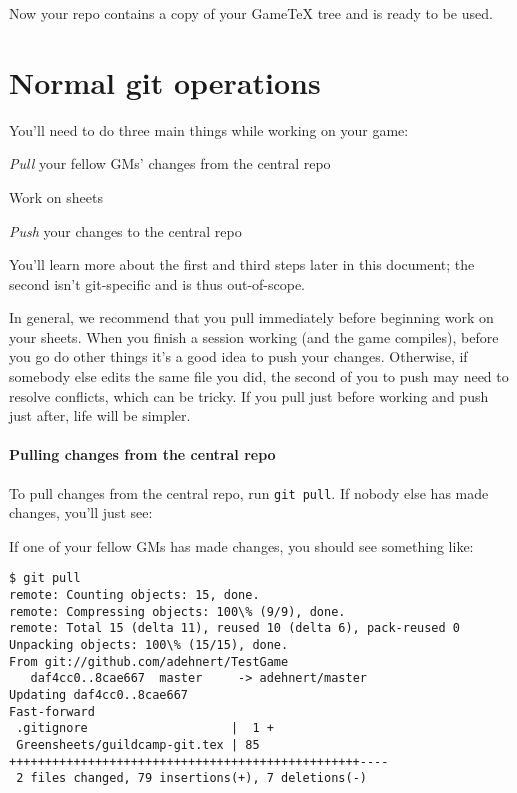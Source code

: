 \documentclass[green]{testgame}
\begin{document}
Now your repo contains a copy of your GameTeX tree and is ready to be
used.

\section{Normal git operations}

You'll need to do three main things while working on your game:
\begin{enum}[]
\item \emph{Pull} your fellow GMs' changes from the central repo
\item Work on sheets
\item \emph{Push} your changes to the central repo
\end{enum}

You'll learn more about the first and third steps later in this document; the second isn't git-specific and is thus out-of-scope.

In general, we recommend that you pull immediately before beginning work on your sheets. When you finish a session working (and the game compiles), before you go do other things it's a good idea to push your changes. Otherwise, if somebody else edits the same file you did, the second of you to push may need to resolve conflicts, which can be tricky. If you pull just before working and push just after, life will be simpler.

\paragraph*{Pulling changes from the central repo}

To pull changes from the central repo, run \texttt{git pull}. If nobody else has made changes, you'll just see:\\

If one of your fellow GMs has made changes, you should see something like:
\begin{verbatim}
$ git pull
remote: Counting objects: 15, done.
remote: Compressing objects: 100\% (9/9), done.
remote: Total 15 (delta 11), reused 10 (delta 6), pack-reused 0
Unpacking objects: 100\% (15/15), done.
From git://github.com/adehnert/TestGame
   daf4cc0..8cae667  master     -> adehnert/master
Updating daf4cc0..8cae667
Fast-forward
 .gitignore                    |  1 +
 Greensheets/guildcamp-git.tex | 85 +++++++++++++++++++++++++++++++++++++++++++++++++----
 2 files changed, 79 insertions(+), 7 deletions(-)
\end{verbatim}
\end{document}
